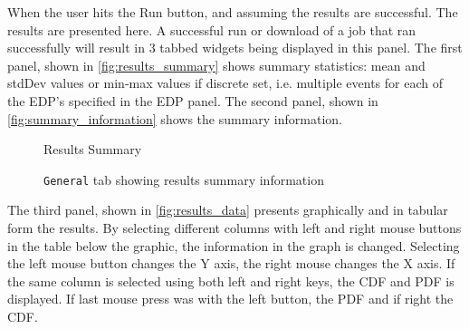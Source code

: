 When the user hits the Run button, and assuming the results are
successful. The results are presented here.  A successful run or
download of a job that ran successfully will result in 3 tabbed
widgets being displayed in this panel.  The first panel, shown in
\autoref{fig:results_summary} shows summary statistics: mean and
stdDev values or min-max values if discrete set, i.e. multiple events
for each of the EDP's specified in the EDP panel. The second panel,
shown in \autoref{fig:summary_information} shows the summary
information.

\begin{figure}[!htbp]
  \caption{Results Summary}
  \label{fig:results_summary}
\end{figure}

\begin{figure}[!htbp]
  \caption{\texttt{General} tab showing results summary information}
  \label{fig:summary_information}
\end{figure}

The third panel, shown in \autoref{fig:results_data} presents
graphically and in tabular form the results. By selecting different
columns with left and right mouse buttons in the table below the
graphic, the information in the graph is changed. Selecting the left
mouse button changes the Y axis, the right mouse changes the X
axis. If the same column is selected using both left and right keys,
the CDF and PDF is displayed. If last mouse press was with the left
button, the PDF and if right the CDF.
 
